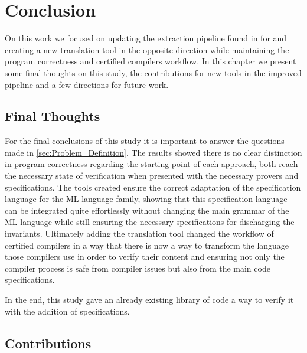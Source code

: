 
%

\chapter{Conclusion}
\label{cha:Conclusion}

On this work we focused on updating the extraction pipeline found in \whyml for \cml and creating a new translation tool in the opposite
direction while maintaining the program correctness and certified compilers workflow. In this chapter we present some final thoughts on this study,
the contributions for new tools in the improved pipeline and a few directions for future work.

\section{Final Thoughts}

For the final conclusions of this study it is important to answer the questions made in \ref{sec:Problem_Definition}. The results showed there is no clear
distinction in program correctness regarding the starting point of each approach, both reach the necessary state of verification when presented with
the necessary provers and specifications. The tools created ensure the correct adaptation of the \gospel specification language for the ML language family, showing that
this specification language can be integrated quite effortlessly without changing the main grammar of the ML language while still ensuring the necessary
specifications for discharging the invariants. Ultimately adding the translation tool changed the workflow of certified compilers in a way that there is now
a way to transform the language those compilers use in order to verify their content and ensuring not only the compiler process is safe from compiler
issues but also from the main code specifications.

In the end, this study gave an already existing library of \cml code a way to verify it with the addition of \gospel specifications.

\section{Contributions}

